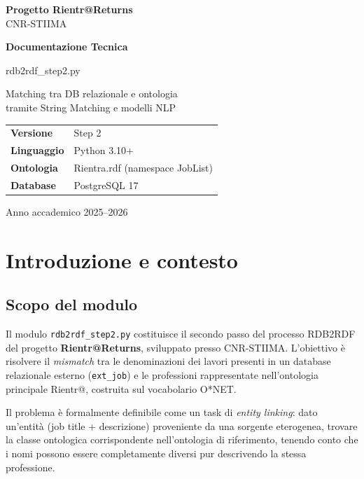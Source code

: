 \documentclass[12pt, a4paper]{report}
\begin{document}
% 

\begin{titlepage}
  \centering
  \vspace*{2cm}
  {\Large\textbf{Progetto Rientr@Returns}\\[0.4em]
   \large CNR-STIIMA}\par
  \vspace{2.5cm}
  {\Huge\bfseries\color{headcolor} Documentazione Tecnica\par}
  \vspace{0.8cm}
  {\LARGE\ttfamily rdb2rdf\_step2.py\par}
  \vspace{0.5cm}
  {\large Matching tra DB relazionale e ontologia\\
   tramite String Matching e modelli NLP\par}
  \vspace{3cm}
  \begin{tabular}{ll}
    \textbf{Versione}   & Step 2 \\[0.3em]
    \textbf{Linguaggio} & Python 3.10+ \\[0.3em]
    \textbf{Ontologia}  & Rientra.rdf (namespace JobList) \\[0.3em]
    \textbf{Database}   & PostgreSQL 17 \\[0.3em]
  \end{tabular}
  \vfill
  {\small\textcolor{codegray}{Anno accademico 2025--2026}}
\end{titlepage}

\tableofcontents
\clearpage

% 
\chapter{Introduzione e contesto}
% 

\section{Scopo del modulo}

Il modulo \texttt{rdb2rdf\_step2.py} costituisce il secondo passo del
processo RDB2RDF del progetto \textbf{Rientr@Returns}, sviluppato
presso CNR-STIIMA. L'obiettivo è risolvere il \emph{mismatch} tra le
denominazioni dei lavori presenti in un database relazionale esterno
(\texttt{ext\_job}) e le professioni rappresentate nell'ontologia
principale Rientr@, costruita sul vocabolario O*NET.

Il problema è formalmente definibile come un task di \emph{entity
linking}: dato un'entità (job title + descrizione) proveniente da una
sorgente eterogenea, trovare la classe ontologica corrispondente
nell'ontologia di riferimento, tenendo conto che i nomi possono essere
completamente diversi pur descrivendo la stessa professione.
\end{document}
